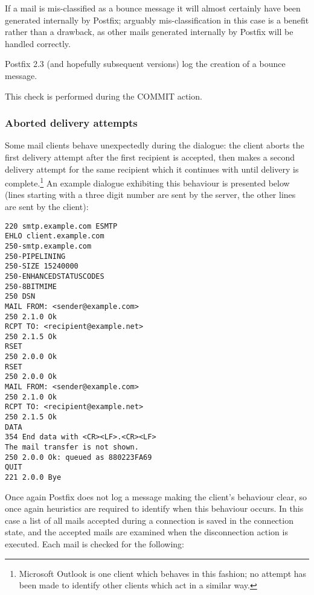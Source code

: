 If a mail is mis-classified as a bounce message it will almost certainly
have been generated internally by Postfix; arguably mis-classification in
this case is a benefit rather than a drawback, as other mails generated
internally by Postfix will be handled correctly.

Postfix 2.3 (and hopefully subsequent versions) log the creation of a
bounce message.

This check is performed during the COMMIT action.

\subsubsection{Aborted delivery attempts}

\label{aborted-delivery-attempts}

Some mail clients behave unexpectedly during the \SMTP{} dialogue: the
client aborts the first delivery attempt after the first recipient is
accepted, then makes a second delivery attempt for the same recipient which
it continues with until delivery is complete.\footnote{Microsoft Outlook is
one client which behaves in this fashion; no attempt has been made to
identify other clients which act in a similar way.}  An example dialogue
exhibiting this behaviour is presented below (lines starting with a three
digit number are sent by the server, the other lines are sent by the
client):

\begin{verbatim}
220 smtp.example.com ESMTP
EHLO client.example.com
250-smtp.example.com
250-PIPELINING
250-SIZE 15240000
250-ENHANCEDSTATUSCODES
250-8BITMIME
250 DSN
MAIL FROM: <sender@example.com>
250 2.1.0 Ok
RCPT TO: <recipient@example.net>
250 2.1.5 Ok
RSET
250 2.0.0 Ok
RSET
250 2.0.0 Ok
MAIL FROM: <sender@example.com>
250 2.1.0 Ok
RCPT TO: <recipient@example.net>
250 2.1.5 Ok
DATA
354 End data with <CR><LF>.<CR><LF>
The mail transfer is not shown.
250 2.0.0 Ok: queued as 880223FA69
QUIT
221 2.0.0 Bye
\end{verbatim}

Once again Postfix does not log a message making the client's behaviour
clear, so once again heuristics are required to identify when this
behaviour occurs.  In this case a list of all mails accepted during a
connection is saved in the connection state, and the accepted mails are
examined when the disconnection action is executed.  Each mail is checked
for the following: 

